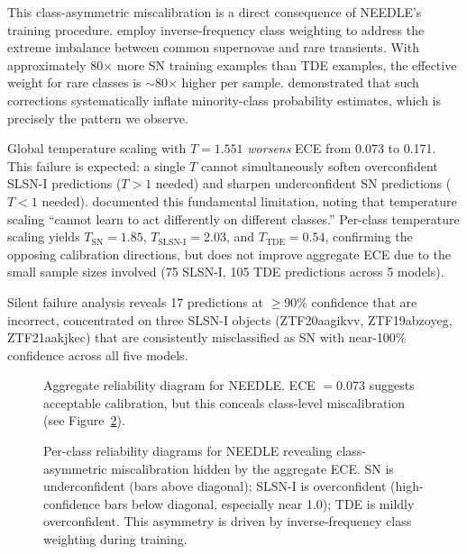 \documentclass[twocolumn]{aastex631}
\begin{document}
This class-asymmetric miscalibration is a direct consequence of NEEDLE's training procedure. \citet{sheng2024} employ inverse-frequency class weighting to address the extreme imbalance between common supernovae and rare transients. With approximately 80$\times$ more SN training examples than TDE examples, the effective weight for rare classes is $\sim$80$\times$ higher per sample. \citet{vandengoorbergh2022} demonstrated that such corrections systematically inflate minority-class probability estimates, which is precisely the pattern we observe.

Global temperature scaling with $T = 1.551$ \emph{worsens} ECE from 0.073 to 0.171. This failure is expected: a single $T$ cannot simultaneously soften overconfident SLSN-I predictions ($T > 1$ needed) and sharpen underconfident SN predictions ($T < 1$ needed). \citet{kull2019} documented this fundamental limitation, noting that temperature scaling ``cannot learn to act differently on different classes.'' Per-class temperature scaling yields $T_{\text{SN}} = 1.85$, $T_{\text{SLSN-I}} = 2.03$, and $T_{\text{TDE}} = 0.54$, confirming the opposing calibration directions, but does not improve aggregate ECE due to the small sample sizes involved (75 SLSN-I, 105 TDE predictions across 5 models).

Silent failure analysis reveals 17 predictions at $\geq$90\% confidence that are incorrect, concentrated on three SLSN-I objects (ZTF20aagikvv, ZTF19abzoyeg, ZTF21aakjkec) that are consistently misclassified as SN with near-100\% confidence across all five models.

\begin{figure}
\caption{Aggregate reliability diagram for NEEDLE. ECE $= 0.073$ suggests acceptable calibration, but this conceals class-level miscalibration (see Figure~\ref{fig:needle_perclass}). \label{fig:needle_aggregate}}
\end{figure}

\begin{figure}
\caption{Per-class reliability diagrams for NEEDLE revealing class-asymmetric miscalibration hidden by the aggregate ECE. SN is underconfident (bars above diagonal); SLSN-I is overconfident (high-confidence bars below diagonal, especially near 1.0); TDE is mildly overconfident. This asymmetry is driven by inverse-frequency class weighting during training. \label{fig:needle_perclass}}
\end{figure}
\end{document}
